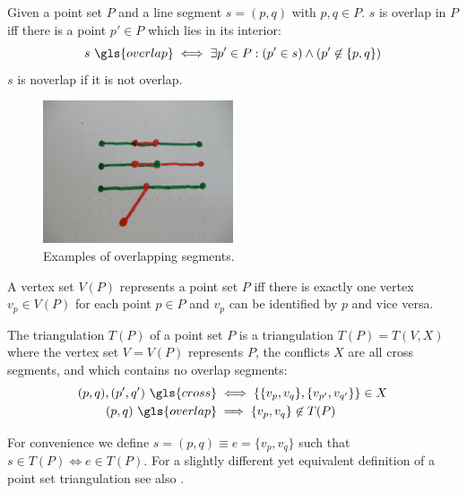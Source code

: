 \begin{definition}
  \label{def:overlapping_segments}
  Given a point set \(P\) and a line segment \(s = (p,q)\) with
  \(p,q \in P\). \(s\) is \gls{overlap} in \(P\) iff there is a point
  \(p' \in P\) which lies in its interior:
  \[
    s~\gls{overlap}
    \iff  \exists p' \in P : (p' \in s) \land (p' \not\in \{p,q\})
  \]
  \(s\) is \gls{noverlap} if it is not \gls{overlap}.
\end{definition}

\begin{figure}[ht]
  \centering
  \includegraphics[width=0.5\textwidth]{img/example_overlapping.jpg}
  \caption{Examples of overlapping segments.}
\end{figure}


\begin{definition}
  A vertex set \(V(P)\) represents a point set \(P\) iff there
  is exactly one vertex \(v_p \in V(P)\) for each point \(p \in P\)
  and \(v_p\) can be identified by \(p\) and vice versa.
%   
\end{definition}

\begin{definition}
  \label{def:point_set_triangulation}
  The triangulation \(T(P)\) of a point set \(P\) is a triangulation
  \(T(P) = T(V,X)\) where the vertex set
  \(V=V(P)\) represents \(P\), the conflicts \(X\) are all
  \gls{cross} segments, and which contains no \gls{overlap} segments:
  \begin{alignat*}{1}
    (p,q), (p',q')~\gls{cross}
    &\iff \left\{ \{v_p,v_q\}, \{v_{p'},v_{q'}\} \right\} \in X \\
     (p,q)~\gls{overlap}
    &\implies \{v_p,v_q\} \not\in T(P)
  \end{alignat*}

  For convenience we define \(s=(p,q) \equiv e=\{v_p,v_q\}\) such
  that \(s \in T(P) \iff e \in T(P)\). For a slightly different yet
  equivalent definition of a point set triangulation see also
  \cite[Section 9.1]{deberg_compgeom}.
\end{definition}

